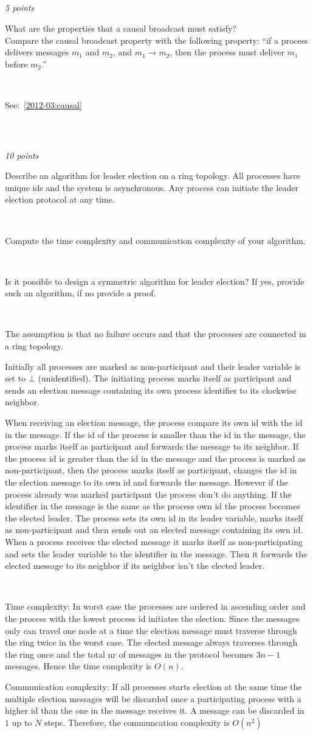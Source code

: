 \documentclass[a4paper]{article}
\newcommand{\points}[1]{\subsection{} \textit{#1 points}\\}
\newcommand{\question}[2][]{
  \parbox[t]{\textwidth}{
    \ifthenelse{\equal{#1}{}}{}{#1)}
    \parbox[t]{0.95\textwidth}{#2}}\\}
\newcommand{\solution}[2][]{
  \ifthenelse{\equal{#1}{} \or \equal{#1}{a}}{\\[3pt]\textit{Solution: }\\[0.1cm]}{}
  \parbox[t]{\textwidth}{
    \ifthenelse{\equal{#1}{}}{}{#1)}
    \parbox[t]{0.95\textwidth}{#2}}\\
}
\begin{document}
%
%
\points{5}
\question{
  What are the properties that a causal broadcast must satisfy? \\
  Compare the causal broadcast property with the following property:
  ``if a process delivers messages $m_1$ and $m_2$, and $m_1 \rightarrow
  m_2$, then the process must deliver $m_1$ before $m_2$.''
}
\solution{See:~\ref{2012-03:causal}}
%
\points{10}
\question[a]{
  Describe an algorithm for leader election on a ring topology. All
  processes have unique ids and the system is asynchronous. Any process
  can initiate the leader election protocol at any time.
}
\question[b]{
Compute the time complexity and communication complexity of
  your algorithm.
}
\question[c]{
  Is it possible to design a symmetric algorithm for leader
  election? If yes, provide such an algorithm, if no provide a proof.
}
%
\solution[a]{
  The assumption is that no failure occurs and that the processes are
  connected in a ring topology.

  Initially all processes are marked as non-participant and their leader
  variable is set to $\bot$ (unidentified). The initiating process marks
  itself as participant and sends an election message containing its own
  process identifier to its clockwise neighbor.

  When receiving an election message, the process compare its own id
  with the id in the message. If the id of the process is smaller than
  the id in the message, the process marks itself as participant and
  forwards the message to its neighbor. If the process id is greater
  than the id in the message and the process is marked as
  non-participant, then the process marks itself as participant, changes
  the id in the election message to its own id and forwards the
  message. However if the process already was marked participant the
  process don't do anything. If the identifier in the message is the
  same as the process own id the process becomes the elected leader. The
  process sets its own id in its leader variable, marks itself as
  non-participant and then sends out an elected message containing its
  own id. When a process receives the elected message it marks itself as
  non-participating and sets the leader variable to the identifier in the
  message. Then it forwards the elected message to its neighbor if its
  neighbor isn't the elected leader.
}
\solution[b]{
  Time complexity:
  In worst case the processes are ordered in ascending order and the
  process with the lowest process id initiates the election. Since the
  messages only can travel one node at a time the election message must
  traverse through the ring twice in the worst case. The elected message
  always traverses through the ring once and the total nr of messages in
  the protocol becomes $3n-1$ messages.  Hence the time complexity is
  $O(n)$.

  Communication complexity:
  If all processes starts election at the same time the multiple
  election messages will be discarded once a participating process with
  a higher id than the one in the message receives it. A message can be
  discarded in $1$ up to $N$ steps.  Therefore, the communcation
  complexity is $O(n^2)$\\
}
\end{document}
